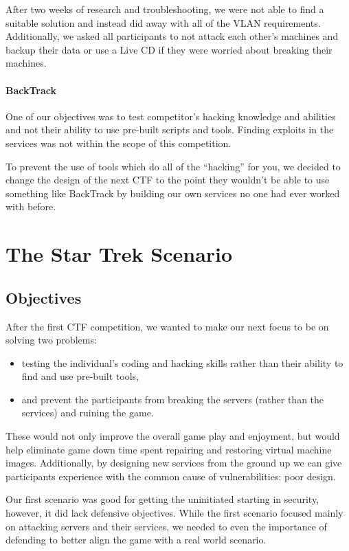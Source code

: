 \documentclass[10pt]{article}
\begin{document}
After two weeks of research and troubleshooting, we were not able to find a
suitable solution and instead did away with all of the VLAN requirements.
Additionally, we asked all participants to not attack each other's machines and
backup their data or use a Live CD if they were worried about breaking their
machines.

\paragraph*{BackTrack} One of our objectives was to test competitor's hacking
knowledge and abilities and not their ability to use pre-built scripts and
tools. Finding exploits in the services was not within the scope of this
competition. 

To prevent the use of tools which do all of the ``hacking'' for you, we decided
to change the design of the next CTF to the point they wouldn't be able to use
something like BackTrack by building our own services no one had ever worked
with before. 

\section{The Star Trek Scenario}
\subsection{Objectives}
After the first CTF competition, we wanted to make our next focus to be on
solving two problems:
\begin{itemize}
	\item testing the individual's coding and hacking skills rather than their
	ability to find and use pre-built tools,
	\item and prevent the participants from breaking the servers (rather than the
	services) and ruining the game.
\end{itemize}

These would not only improve the overall game play and enjoyment, but would
help eliminate game down time spent repairing and restoring virtual machine
images. Additionally, by designing new services from the ground up we can
give participants experience with the common cause of vulnerabilities: poor
design.

Our first scenario was good for getting the uninitiated starting in security,
however, it did lack defensive objectives. While the first scenario focused
mainly on attacking servers and their services, we needed to even the importance
of defending to better align the game with a real world scenario.
\end{document}
